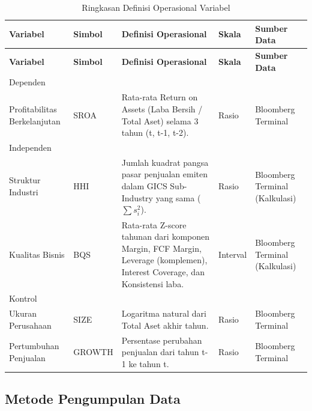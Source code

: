 \documentclass[12pt,a4paper]{article}
\begin{document}
\begin{longtable}{>{\raggedright\arraybackslash}p{} >{\raggedright\arraybackslash}p{} >{\raggedright\arraybackslash}p{} >{\raggedright\arraybackslash}p{} >{\raggedright\arraybackslash}p{}}
\caption{Ringkasan Definisi Operasional Variabel}\label{tab:definisi-operasional}\\
\toprule
\textbf{Variabel} & \textbf{Simbol} & \textbf{Definisi Operasional} & \textbf{Skala} & \textbf{Sumber Data} \\
\midrule
\endfirsthead
\toprule
\textbf{Variabel} & \textbf{Simbol} & \textbf{Definisi Operasional} & \textbf{Skala} & \textbf{Sumber Data} \\
\midrule
\endhead
Dependen & & & & \\
Profitabilitas Berkelanjutan & SROA & Rata-rata Return on Assets (Laba Bersih / Total Aset) selama 3 tahun (t, t-1, t-2). & Rasio & Bloomberg Terminal \\
Independen & & & & \\
Struktur Industri & HHI & Jumlah kuadrat pangsa pasar penjualan emiten dalam GICS Sub-Industry yang sama ($\sum s_i^2$). & Rasio & Bloomberg Terminal (Kalkulasi) \\
Kualitas Bisnis & BQS & Rata-rata Z-score tahunan dari komponen Margin, FCF Margin, Leverage (komplemen), Interest Coverage, dan Konsistensi laba. & Interval & Bloomberg Terminal (Kalkulasi) \\
Kontrol & & & & \\
Ukuran Perusahaan & SIZE & Logaritma natural dari Total Aset akhir tahun. & Rasio & Bloomberg Terminal \\
Pertumbuhan Penjualan & GROWTH & Persentase perubahan penjualan dari tahun t-1 ke tahun t. & Rasio & Bloomberg Terminal \\
\bottomrule
\end{longtable}

\subsection{Metode Pengumpulan Data}\label{metode-pengumpulan-data}
\end{document}
